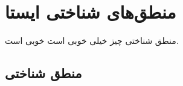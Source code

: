 \chapter{منطق‌های شناختی ایستا}
منطق شناختی چیز خیلی خوبی است خوبی است.
\section{منطق شناختی \texorpdfstring{ }{(EL)}}

